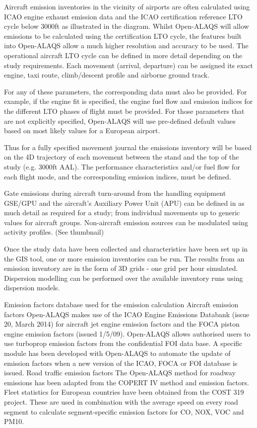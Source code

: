 \documentclass[a4paper]{article}
\begin{document}
    Aircraft emission inventories in the vicinity of airports are often calculated using ICAO engine exhaust emission data and the ICAO certification reference LTO cycle below 3000ft as illustrated in the diagram. Whilst Open-ALAQS will allow emissions to be calculated using the certification LTO cycle, the features built into Open-ALAQS allow a much higher resolution and accuracy to be used. The operational aircraft LTO cycle can be defined in more detail depending on the study requirements. Each movement (arrival, departure) can be assigned its exact engine, taxi route, climb/descent profile and airborne ground track. 
    
    For any of these parameters, the corresponding data must also be provided. For example, if the engine fit is specified, the engine fuel flow and emission indices for the different LTO phases of flight must be provided. For those parameters that are not explicitly specified, Open-ALAQS will use pre-defined default values based on most likely values for a European airport.
    
    Thus for a fully specified movement journal the emissions inventory will be based on the 4D trajectory of each movement between the stand and the top of the study (e.g. 3000ft AAL). The performance characteristics and/or fuel flow for each flight mode, and the corresponding emission indices, must be defined.
    
    Gate emissions during aircraft turn-around from the handling equipment GSE/GPU and the aircraft’s Auxiliary Power Unit (APU) can be defined in as much detail as required for a study; from individual movements up to generic values for aircraft groups. Non-aircraft emission sources can be modulated using activity profiles. (See thumbnail)
    
    Once the study data have been collected and characteristics have been set up in the GIS tool, one or more emission inventories can be run. The results from an emission inventory are in the form of 3D grids - one grid per hour simulated. Dispersion modelling can be performed over the available inventory runs using dispersion models.
    
    
    
    Emission factors database used for the emission calculation
    Aircraft emission factors	Open-ALAQS makes use of the ICAO Engine Emissions Databank (issue 20, March 2014) for aircraft jet engine emission factors and the FOCA piston engine emission factors (issued 1/5/09). Open-ALAQS allows authorised users to use turboprop emission factors from the confidential FOI data base. A specific module has been developed with Open-ALAQS to automate the update of emission factors when a new version of the ICAO, FOCA or FOI database is issued.
    Road traffic emission factors	
    The Open-ALAQS method for roadway emissions has been adapted from the COPERT IV method and emission factors. Fleet statistics for European countries have been obtained from the COST 319 project. These are used in combination with the average speed on every road segment to calculate segment-specific emission factors for CO, NOX, VOC and PM10.
\end{document}

